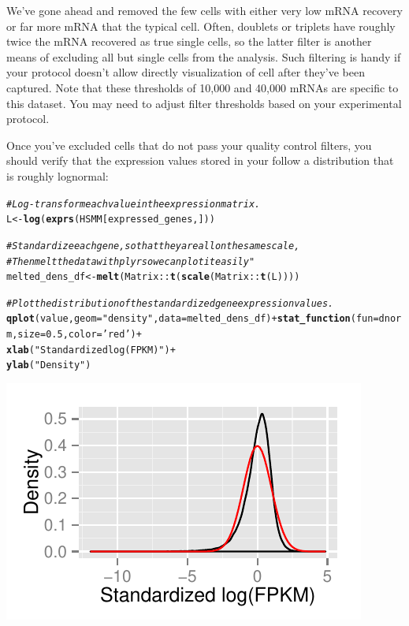 \documentclass[10pt,oneside]{article}\usepackage[]{graphicx}\usepackage[]{color}
\makeatletter
\def\maxwidth{ %
  \ifdim\Gin@nat@width>\linewidth
    \linewidth
  \else
    \Gin@nat@width
  \fi
}
\newcommand{\hlnum}[1]{\textcolor[rgb]{0.686,0.059,0.569}{#1}}%
\newcommand{\hlstr}[1]{\textcolor[rgb]{0.192,0.494,0.8}{#1}}%
\newcommand{\hlcom}[1]{\textcolor[rgb]{0.678,0.584,0.686}{\textit{#1}}}%
\newcommand{\hlopt}[1]{\textcolor[rgb]{0,0,0}{#1}}%
\newcommand{\hlstd}[1]{\textcolor[rgb]{0.345,0.345,0.345}{#1}}%
\newcommand{\hlkwb}[1]{\textcolor[rgb]{0.69,0.353,0.396}{#1}}%
\newcommand{\hlkwc}[1]{\textcolor[rgb]{0.333,0.667,0.333}{#1}}%
\newcommand{\hlkwd}[1]{\textcolor[rgb]{0.737,0.353,0.396}{\textbf{#1}}}%
\newenvironment{kframe}{%
 \def\at@end@of@kframe{}%
 \ifinner\ifhmode%
  \def\at@end@of@kframe{\end{minipage}}%
  \begin{minipage}{\columnwidth}%
 \fi\fi%
 \def\FrameCommand##1{\hskip\@totalleftmargin \hskip-\fboxsep
 \colorbox{shadecolor}{##1}\hskip-\fboxsep
     \hskip-\linewidth \hskip-\@totalleftmargin \hskip\columnwidth}%
 \MakeFramed {\advance\hsize-\width
   \@totalleftmargin\z@ \linewidth\hsize
   \@setminipage}}%
 {\par\unskip\endMakeFramed%
 \at@end@of@kframe}
\newenvironment{knitrout}{}{} %
\makeatother
\begin{document}
 We've gone ahead and removed the few cells with either very low mRNA recovery or far more mRNA that the typical cell. Often, doublets or triplets have roughly twice the mRNA recovered as true single cells, so the latter filter is another means of excluding all but single cells from the analysis. Such filtering is handy if your protocol doesn't allow directly visualization of cell after they've been captured. Note that these thresholds of 10,000 and 40,000 mRNAs are specific to this dataset. You may need to adjust filter thresholds based on your experimental protocol.
 
 Once you've excluded cells that do not pass your quality control filters, you should verify that the expression values stored in your  follow a distribution that is roughly lognormal:  
\begin{knitrout}
\color{fgcolor}\begin{kframe}
\begin{alltt}
\hlcom{# Log-transform each value in the expression matrix.}
\hlstd{L} \hlkwb{<-} \hlkwd{log}\hlstd{(}\hlkwd{exprs}\hlstd{(HSMM[expressed_genes,]))}

\hlcom{# Standardize each gene, so that they are all on the same scale,}
\hlcom{# Then melt the data with plyr so we can plot it easily"}
\hlstd{melted_dens_df} \hlkwb{<-} \hlkwd{melt}\hlstd{(Matrix}\hlopt{::}\hlkwd{t}\hlstd{(}\hlkwd{scale}\hlstd{(Matrix}\hlopt{::}\hlkwd{t}\hlstd{(L))))}

\hlcom{# Plot the distribution of the standardized gene expression values.}
\hlkwd{qplot}\hlstd{(value,} \hlkwc{geom}\hlstd{=}\hlstr{"density"}\hlstd{,} \hlkwc{data}\hlstd{=melted_dens_df)} \hlopt{+}  \hlkwd{stat_function}\hlstd{(}\hlkwc{fun} \hlstd{= dnorm,} \hlkwc{size}\hlstd{=}\hlnum{0.5}\hlstd{,} \hlkwc{color}\hlstd{=}\hlstr{'red'}\hlstd{)} \hlopt{+}
  \hlkwd{xlab}\hlstd{(}\hlstr{"Standardized log(FPKM)"}\hlstd{)} \hlopt{+}
  \hlkwd{ylab}\hlstd{(}\hlstr{"Density"}\hlstd{)}
\end{alltt}
\end{kframe}

{\centering \includegraphics[width=\maxwidth]{figure/lognormal_plot-1} 

}



\end{knitrout}
 
\end{document}
